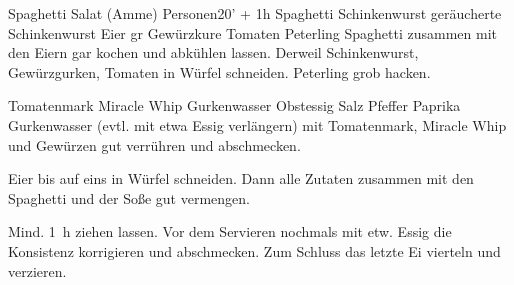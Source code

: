 \begin{MyRecipe}{Spaghetti Salat (Amme)}{ Personen}{20' + 1h}
	 {Spaghetti}
	\ingredient[\Calc{0.1}{\x}]{\si{\kilogram}} {Schinkenwurst}
	\ingredient[\Calc{0.1}{\x}]{\si{\kilogram}} {geräucherte Schinkenwurst}
	\ingredient[\Calc{5}{\x}]{} {Eier}
	\ingredient[\Calc{2}{\x}]{} {gr Gewürzkure}
	\ingredient[\Calc{4}{\x}]{} {Tomaten}
	 {Peterling}
	Spaghetti zusammen mit den Eiern gar kochen und abkühlen lassen. Derweil Schinkenwurst, Gewürzgurken, Tomaten in Würfel schneiden. Peterling grob hacken.\par\bigskip

	\ingredient[]{} {Tomatenmark}
	 {Miracle Whip}
	\ingredient[]{} {Gurkenwasser}
	\ingredient[etw.]{} {Obstessig}
	\ingredient[]{} {Salz}
	\ingredient[]{} {Pfeffer}
	\ingredient[]{} {Paprika}
	Gurkenwasser (evtl. mit etwa Essig verlängern) mit Tomatenmark, Miracle Whip und Gewürzen gut verrühren und abschmecken.\par\bigskip

	Eier bis auf eins in Würfel schneiden. Dann alle Zutaten zusammen mit den Spaghetti und der Soße gut vermengen.\par\bigskip
	
	Mind. \SI{1}{\hour} ziehen lassen. Vor dem Servieren nochmals mit etw. Essig die Konsistenz korrigieren und abschmecken. Zum Schluss das letzte Ei vierteln und verzieren.
	
	
	
	
\end{MyRecipe}